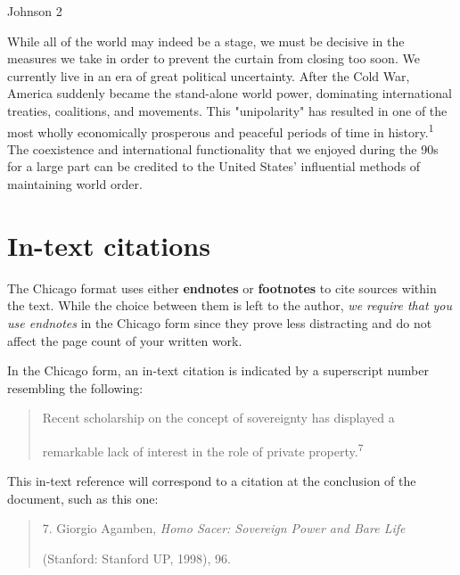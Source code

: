 

\thispagestyle{empty}
\begin{flushright}Johnson 2\end{flushright}
\bigskip
\begin{Spacing}{2}

 While all of the world may indeed be a stage, we must be decisive in the measures we 
take in order to prevent the curtain from closing too soon. We currently live in an era 
of great political uncertainty. After the Cold War, America suddenly became the 
stand-alone world power, dominating international treaties, coalitions, and movements. 
This "unipolarity" has resulted in one of the most wholly economically prosperous and 
peaceful periods of time in history.\textsuperscript{1} The coexistence and international 
functionality that we enjoyed during the 90s for a large part can be credited to the 
United States' influential methods of maintaining world order.
\end{Spacing}
\newpage



\section {In-text citations}
The Chicago format uses either \textbf{endnotes} or \textbf{footnotes} to cite sources 
within the text. While the choice between them is left to the author, 
\emph{we require that you use endnotes} in the Chicago form since they prove less 
distracting and do not affect the page count of your written work. 

In the Chicago form, an in-text citation is indicated by a superscript number resembling 
the following:

\begin{quote}
Recent scholarship on the concept of sovereignty has displayed a 

remarkable lack of interest in the role of private property.\textsuperscript{7}
\end{quote}
This in-text reference will correspond to a citation at the conclusion of the document, 
such as this one:

\begin{quote}
\hspace{.4in}7. Giorgio Agamben, \emph{Homo Sacer: Sovereign Power and Bare Life}

(Stanford: Stanford UP, 1998), 96.
\end{quote}



